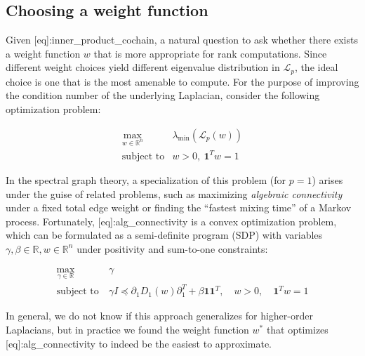 \subsection{\texorpdfstring{Choosing a weight function }{Choosing a weight function }}

Given {[}eq{]}:inner\_product\_cochain, a natural question to ask whether there exists a weight function \(w\) that is more appropriate for rank computations. Since different weight choices yield different eigenvalue distribution in \(\mathcal{L}_{p}\), the ideal choice is one that is the most amenable to compute. For the purpose of improving the condition number of the underlying Laplacian, consider the following optimization problem:

\[\begin{aligned}
\max\limits_{w \in \mathbb{R}^{n}} & \lambda_{\min}\left( \mathcal{L}_{p}(w) \right) \\
\text{subject to} & w > 0,\:\mathbf{1}^{T}w = 1
\end{aligned}\] \label{eq:alg_connectivity}{}

In the spectral graph theory, a specialization of this problem (for \(p = 1\)) arises under the guise of related problems, such as maximizing \emph{algebraic connectivity} under a fixed total edge weight or finding the ``fastest mixing time'' of a Markov process. Fortunately, {[}eq{]}:alg\_connectivity is a convex optimization problem, which can be formulated as a semi-definite program (SDP) with variables \(\gamma,\beta \in \mathbb{R},w \in \mathbb{R}^{n}\) under positivity and sum-to-one constraints:

\[\begin{aligned}
\max\limits_{\gamma \in \mathbb{R}}\: & \gamma \\
\text{subject to}\: & \gamma I \preceq \partial_{1}D_{1}(w)\partial_{1}^{T} + \beta\mathbf{1}\mathbf{1}^{T},\quad w > 0,\quad\mathbf{1}^{T}w = 1
\end{aligned}\]

In general, we do not know if this approach generalizes for higher-order Laplacians, but in practice we found the weight function \(w^{\ast}\) that optimizes {[}eq{]}:alg\_connectivity to indeed be the easiest to approximate.
